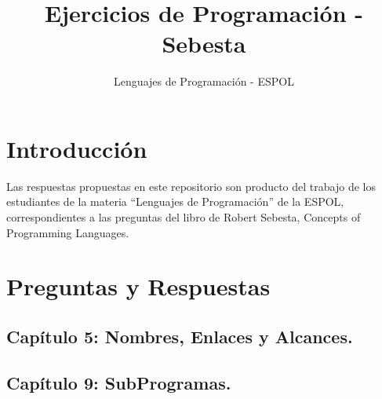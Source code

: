 \documentclass[12pt,oneside]{article}
\title{Ejercicios de Programación - Sebesta}
\author{Lenguajes de Programación - ESPOL}
\begin{document}
\maketitle

\section{Introducción}
Las respuestas propuestas en este repositorio son producto del trabajo de los estudiantes de la materia ``Lenguajes de Programación'' de la ESPOL, correspondientes a las preguntas del libro de Robert Sebesta, Concepts of Programming Languages.

\section{Preguntas y Respuestas}

\subsection{Capítulo 5: Nombres, Enlaces y Alcances.}



\subsection{Capítulo 9: SubProgramas.}

%
%

\end{document}
